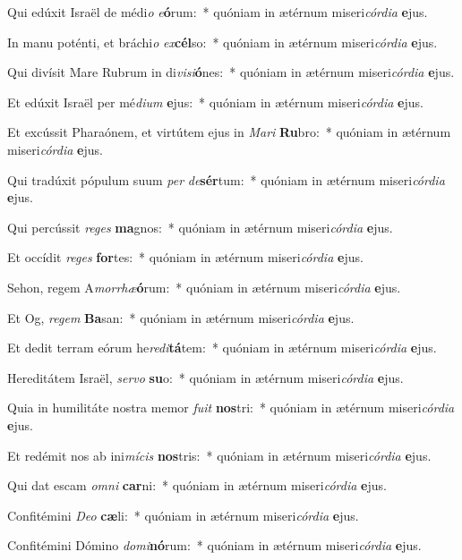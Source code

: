 \item Qui edúxit Israël de médi\textit{o} \textit{e}\textbf{ó}rum:~* quóniam in ætérnum miseri\textit{cór}\textit{di}\textit{a} \textbf{e}jus.
\item In manu poténti, et bráchi\textit{o} \textit{ex}\textbf{cél}so:~* quóniam in ætérnum miseri\textit{cór}\textit{di}\textit{a} \textbf{e}jus.
\item Qui divísit Mare Rubrum in di\textit{vi}\textit{si}\textbf{ó}nes:~* quóniam in ætérnum miseri\textit{cór}\textit{di}\textit{a} \textbf{e}jus.
\item Et edúxit Israël per mé\textit{di}\textit{um} \textbf{e}jus:~* quóniam in ætérnum miseri\textit{cór}\textit{di}\textit{a} \textbf{e}jus.
\item Et excússit Pharaónem, et virtútem ejus in \textit{Ma}\textit{ri} \textbf{Ru}bro:~* quóniam in ætérnum miseri\textit{cór}\textit{di}\textit{a} \textbf{e}jus.
\item Qui tradúxit pópulum suum \textit{per} \textit{de}\textbf{sér}tum:~* quóniam in ætérnum miseri\textit{cór}\textit{di}\textit{a} \textbf{e}jus.
\item Qui percússit \textit{re}\textit{ges} \textbf{ma}gnos:~* quóniam in ætérnum miseri\textit{cór}\textit{di}\textit{a} \textbf{e}jus.
\item Et occídit \textit{re}\textit{ges} \textbf{for}tes:~* quóniam in ætérnum miseri\textit{cór}\textit{di}\textit{a} \textbf{e}jus.
\item Sehon, regem A\textit{mor}\textit{rhæ}\textbf{ó}rum:~* quóniam in ætérnum miseri\textit{cór}\textit{di}\textit{a} \textbf{e}jus.
\item Et Og, \textit{re}\textit{gem} \textbf{Ba}san:~* quóniam in ætérnum miseri\textit{cór}\textit{di}\textit{a} \textbf{e}jus.
\item Et dedit terram eórum he\textit{re}\textit{di}\textbf{tá}tem:~* quóniam in ætérnum miseri\textit{cór}\textit{di}\textit{a} \textbf{e}jus.
\item Hereditátem Israël, \textit{ser}\textit{vo} \textbf{su}o:~* quóniam in ætérnum miseri\textit{cór}\textit{di}\textit{a} \textbf{e}jus.
\item Quia in humilitáte nostra memor \textit{fu}\textit{it} \textbf{nos}tri:~* quóniam in ætérnum miseri\textit{cór}\textit{di}\textit{a} \textbf{e}jus.
\item Et redémit nos ab ini\textit{mí}\textit{cis} \textbf{nos}tris:~* quóniam in ætérnum miseri\textit{cór}\textit{di}\textit{a} \textbf{e}jus.
\item Qui dat escam \textit{om}\textit{ni} \textbf{car}ni:~* quóniam in ætérnum miseri\textit{cór}\textit{di}\textit{a} \textbf{e}jus.
\item Confitémini \textit{De}\textit{o} \textbf{cæ}li:~* quóniam in ætérnum miseri\textit{cór}\textit{di}\textit{a} \textbf{e}jus.
\item Confitémini Dómino \textit{do}\textit{mi}\textbf{nó}rum:~* quóniam in ætérnum miseri\textit{cór}\textit{di}\textit{a} \textbf{e}jus.
